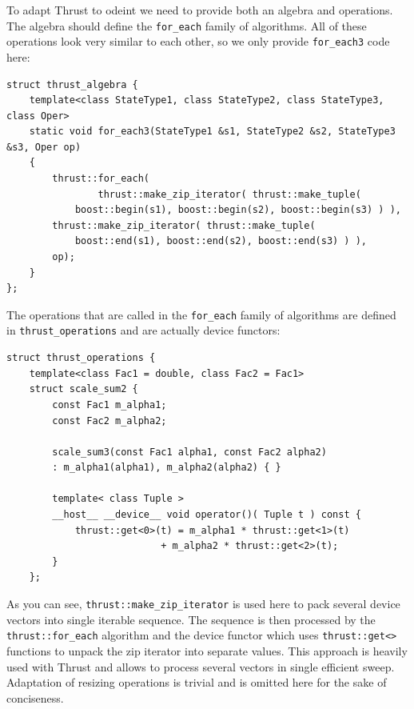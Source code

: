 \documentclass[final]{siamltex}
\newcommand{\code}[1]{\lstinline|#1|}
\begin{document}
To adapt Thrust to odeint we need to provide both an algebra and
operations. The algebra should define the \code{for_each} family of
algorithms. All of these operations look very similar to each other,
so we only provide \code{for_each3} code here:
\begin{lstlisting}
struct thrust_algebra {
    template<class StateType1, class StateType2, class StateType3, class Oper>
    static void for_each3(StateType1 &s1, StateType2 &s2, StateType3 &s3, Oper op)
    {
        thrust::for_each(
                thrust::make_zip_iterator( thrust::make_tuple(
		    boost::begin(s1), boost::begin(s2), boost::begin(s3) ) ),
		thrust::make_zip_iterator( thrust::make_tuple( 
		    boost::end(s1), boost::end(s2), boost::end(s3) ) ),
		op);
    }
};
\end{lstlisting}

The operations that are called in the \code{for_each} family of algorithms are
defined in \code{thrust_operations} and are actually device functors:
\begin{lstlisting}
struct thrust_operations {
    template<class Fac1 = double, class Fac2 = Fac1>
    struct scale_sum2 {
        const Fac1 m_alpha1;
        const Fac2 m_alpha2;

        scale_sum3(const Fac1 alpha1, const Fac2 alpha2)
	    : m_alpha1(alpha1), m_alpha2(alpha2) { }

        template< class Tuple >
        __host__ __device__ void operator()( Tuple t ) const {
            thrust::get<0>(t) = m_alpha1 * thrust::get<1>(t)
	                       + m_alpha2 * thrust::get<2>(t);
        }
    };
\end{lstlisting}

As you can see, \code{thrust::make_zip_iterator} is used here to pack several
device vectors into single iterable sequence. The sequence is then processed by
the \code{thrust::for_each} algorithm and the device functor which uses
\code{thrust::get<>} functions to unpack the zip iterator into separate values.
This approach is heavily used with Thrust and allows to process several vectors
in single efficient sweep. Adaptation of resizing operations is trivial and is
omitted here for the sake of conciseness.
\end{document}
